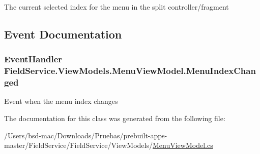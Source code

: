 The current selected index for the menu in the split controller/fragment 



\subsection{Event Documentation}
\hypertarget{class_field_service_1_1_view_models_1_1_menu_view_model_a8f7c18e4878f8977e177a96e26e3b08e}{
\subsubsection[{Menu\+Index\+Changed}]{\setlength{\rightskip}{0pt plus 5cm}Event\+Handler Field\+Service.\+View\+Models.\+Menu\+View\+Model.\+Menu\+Index\+Changed}}\label{class_field_service_1_1_view_models_1_1_menu_view_model_a8f7c18e4878f8977e177a96e26e3b08e}


Event when the menu index changes 



The documentation for this class was generated from the following file\+:\begin{DoxyCompactItemize}
\item 
/\+Users/bsd-\/mac/\+Downloads/\+Pruebas/prebuilt-\/apps-\/master/\+Field\+Service/\+Field\+Service/\+View\+Models/\hyperlink{_menu_view_model_8cs}{Menu\+View\+Model.\+cs}\end{DoxyCompactItemize}
